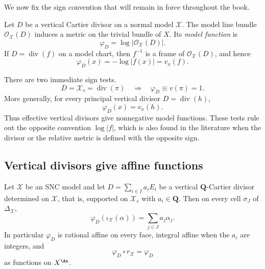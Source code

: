 We now fix the sign convention that will remain in force throughout the
book.

\begin{definition}
\label{def:skeleton-model-function}
Let $D$ be a vertical Cartier divisor on a normal model $\mathcal X$.
The model line bundle $\mathcal O_{\mathcal X}(D)$ induces a metric on the
trivial bundle of $X$. Its \emph{model function} is
\[
                 \varphi_D=\log|\mathcal O_{\mathcal X}(D)|.
\]
If $D=\operatorname{div}(f)$ on a model chart, then $f^{-1}$ is a frame
of $\mathcal O_{\mathcal X}(D)$, and hence
\[
                    \varphi_D(x)=-\log|f(x)|=v_x(f).
\]
\end{definition}

There are two immediate sign tests.
\[
 D=\mathcal X_s=\operatorname{div}(\pi)
       \quad\Longrightarrow\quad \varphi_D\equiv v(\pi)=1.
\]
More generally, for every principal vertical divisor
$D=\operatorname{div}(h)$,
\[
                         \varphi_D(x)=v_x(h).
\]
Thus effective vertical divisors give nonnegative model functions. These
tests rule out the opposite convention $\log|f|$, which is also found in
the literature when the divisor or the relative metric is defined with the
opposite sign.

\subsection{Vertical divisors give affine functions}

\begin{lemma}
\label{lem:model-function-affine}
Let $\mathcal X$ be an SNC model and let
$D=\sum_{i\in I}a_iE_i$ be a vertical $\mathbf Q$-Cartier divisor
determined on $\mathcal X$, that is, supported on $\mathcal X_s$ with
$a_i\in\mathbf Q$. Then on every cell $\sigma_J$ of
$\Delta_{\mathcal X}$,
\[
       \varphi_D(\iota_{\mathcal X}(\alpha))
                    =\sum_{j\in J}a_j\alpha_j.
\]
In particular $\varphi_D$ is rational affine on every face, integral
affine when the $a_i$ are integers, and
\[
                  \varphi_D\circ r_{\mathcal X}=\varphi_D
\]
as functions on $X^{\An}$.
\end{lemma}


